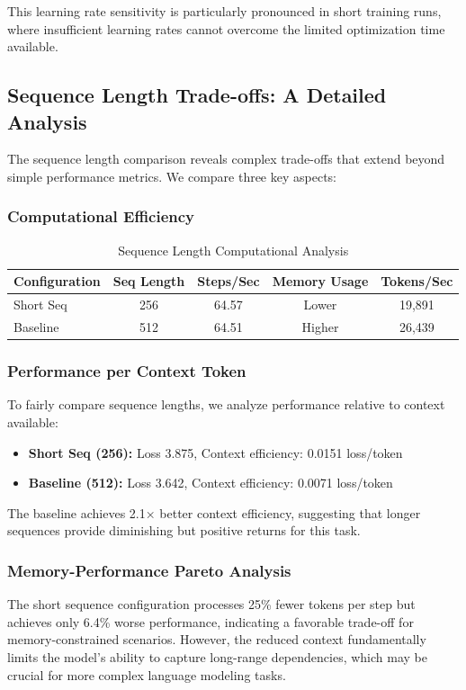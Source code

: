 \documentclass[11pt,a4paper]{article}
\begin{document}
This learning rate sensitivity is particularly pronounced in short training runs, where insufficient learning rates cannot overcome the limited optimization time available.

\subsection{Sequence Length Trade-offs: A Detailed Analysis}
The sequence length comparison reveals complex trade-offs that extend beyond simple performance metrics. We compare three key aspects:

\subsubsection{Computational Efficiency}
\begin{table}[H]
\centering
\caption{Sequence Length Computational Analysis}
\label{tab:seq_analysis}
\begin{tabular}{@{}lcccc@{}}
\toprule
Configuration & Seq Length & Steps/Sec & Memory Usage & Tokens/Sec \\
\midrule
Short Seq & 256 & 64.57 & Lower & 19,891 \\
Baseline & 512 & 64.51 & Higher & 26,439 \\
\bottomrule
\end{tabular}
\end{table}

\subsubsection{Performance per Context Token}
To fairly compare sequence lengths, we analyze performance relative to context available:

\begin{itemize}
    \item \textbf{Short Seq (256):} Loss 3.875, Context efficiency: 0.0151 loss/token
    \item \textbf{Baseline (512):} Loss 3.642, Context efficiency: 0.0071 loss/token
\end{itemize}

The baseline achieves 2.1× better context efficiency, suggesting that longer sequences provide diminishing but positive returns for this task.

\subsubsection{Memory-Performance Pareto Analysis}
The short sequence configuration processes 25\% fewer tokens per step but achieves only 6.4\% worse performance, indicating a favorable trade-off for memory-constrained scenarios. However, the reduced context fundamentally limits the model's ability to capture long-range dependencies, which may be crucial for more complex language modeling tasks.
\end{document}
